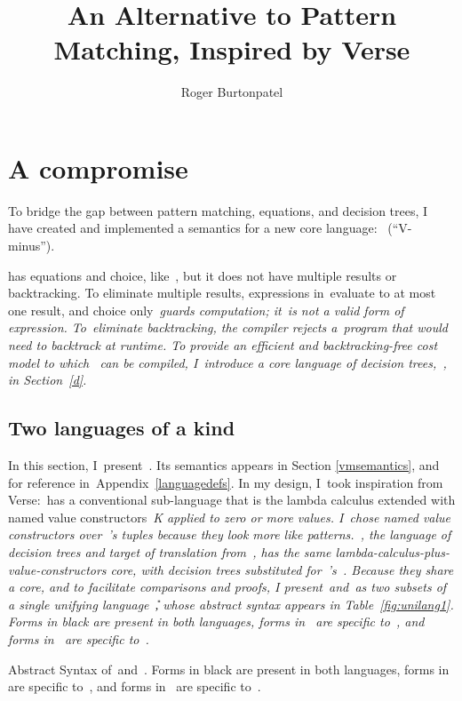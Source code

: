 \documentclass[manuscript,screen 12pt, nonacm]{acmart}
\title{An Alternative to Pattern Matching, Inspired by Verse}
\author{Roger Burtonpatel}
\affiliation{%
\institution{Tufts University}
\streetaddress{419 Boston Ave}
  \city{Medford}
  \state{Massachusetts}
  \country{USA}
  \postcode{02155}
  }
\begin{document}
  
\section{A compromise}
\label{compromise}
    
    To bridge the gap between pattern matching, equations, and decision trees, I
    have created and implemented a semantics for a new core language:~\VMinus
     (``V-minus''). 
    
    \VMinus has equations and choice, like~\VC, but it does not have multiple results or
    backtracking. To eliminate multiple results, expressions in~\VMinus evaluate
    to at most one result, and choice only~\it{guards} computation; it~is not a
    valid form of expression. To~eliminate backtracking, the
    compiler rejects a~\VMinus program that would need to backtrack at runtime.
    To provide an efficient and backtracking-free cost model to which~\VMinus
    can be compiled, I~introduce a core language of decision trees,~\D,
    in Section~\ref{d}. 

    \subsection{Two languages of a kind}
    
    In this section, I~present~\VMinus. Its semantics appears in Section
    \ref{vmsemantics}, and for reference in~Appendix~\ref{languagedefs}. In my
    design, I~took inspiration from Verse:~\VMinus has a conventional
    sub-language that is the lambda calculus extended with named value
    constructors~\it{K} applied to zero or more values. I~chose named value
    constructors over~\VC's tuples because they look more like patterns.~\D, the
    language of decision trees and target of translation from~\VMinus, has the
    same lambda-calculus-plus-value-constructors core, with decision trees
    substituted for~\VMinus's~\iffibf. Because they share a core, and to
    facilitate comparisons and proofs, I present~\VMinus and~\D as two subsets
    of a single unifying language~\U, whose abstract syntax appears in
    Table~\ref{fig:unilang1}. Forms in black are present in both languages,
    forms in~ are specific to~\VMinus, and forms in~ are
    specific to~\D. 

    \begin{table}[ht]
      \utable
      \caption{Abstract Syntax of~\VMinus and~\D. Forms in black are present in
              both languages, forms in~ are specific to~\VMinus, and
              forms in~ are specific to~\D.}
      \label{fig:unilang1}
    \end{table}
\end{document}
